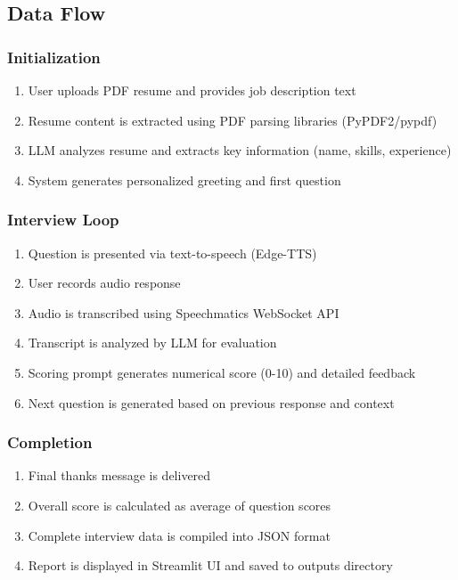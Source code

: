 \documentclass[conference]{IEEEtran}
\begin{document}
\subsection{Data Flow}

\subsubsection{Initialization}
\begin{enumerate}
\item User uploads PDF resume and provides job description text
\item Resume content is extracted using PDF parsing libraries (PyPDF2/pypdf)
\item LLM analyzes resume and extracts key information (name, skills, experience)
\item System generates personalized greeting and first question
\end{enumerate}

\subsubsection{Interview Loop}
\begin{enumerate}
\item Question is presented via text-to-speech (Edge-TTS)
\item User records audio response
\item Audio is transcribed using Speechmatics WebSocket API
\item Transcript is analyzed by LLM for evaluation
\item Scoring prompt generates numerical score (0-10) and detailed feedback
\item Next question is generated based on previous response and context
\end{enumerate}

\subsubsection{Completion}
\begin{enumerate}
\item Final thanks message is delivered
\item Overall score is calculated as average of question scores
\item Complete interview data is compiled into JSON format
\item Report is displayed in Streamlit UI and saved to outputs directory
\end{enumerate}
\end{document}

